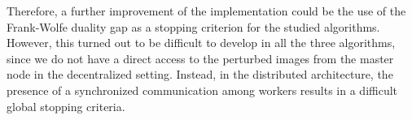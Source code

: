 Therefore, a further improvement of the implementation could be the use of the Frank-Wolfe duality gap as a stopping criterion for the studied algorithms.\\ However, this turned out to be difficult to develop in all the three algorithms, since we do not have a direct access to the perturbed images from the master node in the decentralized setting. Instead, in the distributed architecture, the presence of a synchronized communication among workers results in a difficult global stopping criteria.